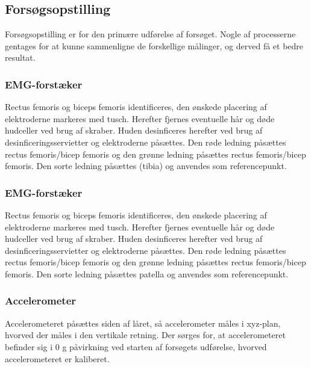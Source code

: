 \subsection{Forsøgsopstilling}
Forsøgsopstilling er for den primære udførelse af forsøget. Nogle af processerne gentages for at kunne sammenligne de forskellige målinger, og derved få et bedre resultat.

\subsubsection{EMG-forstæker}
Rectus femoris og biceps femoris identificeres, den ønskede placering af elektroderne markeres med tusch. Herefter fjernes eventuelle hår og døde hudceller ved brug af skraber. Huden desinficeres herefter ved brug af desinficeringsservietter og elektroderne påsættes. Den røde ledning påsættes rectus femoris/bicep femoris og den grønne ledning påsættes rectus femoris/bicep femoris. Den sorte ledning påsættes (tibia) og anvendes som referencepunkt.
\subsubsection{EMG-forstæker}
Rectus femoris og biceps femoris identificeres, den ønskede placering af elektroderne markeres med tusch. Herefter fjernes eventuelle hår og døde hudceller ved brug af skraber. Huden desinficeres herefter ved brug af desinficeringsservietter og elektroderne påsættes. Den røde ledning påsættes rectus femoris/bicep femoris og den grønne ledning påsættes rectus femoris/bicep femoris. Den sorte ledning påsættes patella og anvendes som referencepunkt.


\subsubsection{Accelerometer}
Accelerometeret påsættes siden af låret, så accelerometer måles i xyz-plan, hvorved der måles i den vertikale retning. Der sørges for,  at accelerometeret befinder sig i 0 g påvirkning ved starten af forsøgets udførelse, hvorved accelerometeret er kaliberet. 

